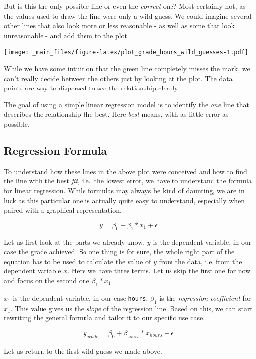 \documentclass[
]{book}
\begin{document}
But is this the only possible line or even the \emph{correct} one? Most certainly not,
as the values used to draw the line were only a wild guess. We
could imagine several other lines that also look more or less reasonable - as
well as some that look unreasonable - and add them to the plot.

\texttt{[image: \_main\_files/figure-latex/plot\_grade\_hours\_wild\_guesses-1.pdf]}

While we have some intuition that the green line completely misses the mark, we
can't really decide between the others just by looking at the plot. The
data points are way to dispersed to see the relationship clearly.

The goal of using a simple linear regression model is to identify the \emph{one} line
that describes the relationship the best. Here \emph{best} means, with as little
error as possible.

\hypertarget{regression-formula}{%
\subsection{Regression Formula}\label{regression-formula}}

To understand how these lines in the above plot were conceived and how to find
the line with the best \emph{fit}, i.e.~the lowest error, we have to understand the
formula for linear regression. While formulas may always be kind of daunting,
we are in luck as this particular one is actually quite easy to understand,
especially when paired with a graphical representation.

\[y = \beta_0 + \beta_1*x_1 + \epsilon\]

Let us first look at the parts we already know. \(y\) is the dependent variable,
in our case the grade achieved. So one thing is for sure, the whole right part
of the equation has to be used to calculate the value of \(y\) from the data, i.e.
from the dependent variable \(x\). Here we have three terms. Let us skip the first one
for now and focus on the second one \(\beta_1*x_1\).

\(x_1\) is the dependent variable, in our case \texttt{hours}. \(\beta_1\) is the
\emph{regression coefficient} for \(x_1\). This value gives us the \emph{slope} of the
regression line. Based on this, we can start rewriting the general formula and
tailor it to our specific use case.

\[y_{grade} = \beta_0 + \beta_{hours}*x_{hours} + \epsilon\]

Let us return to the first wild guess we made above.
\end{document}
